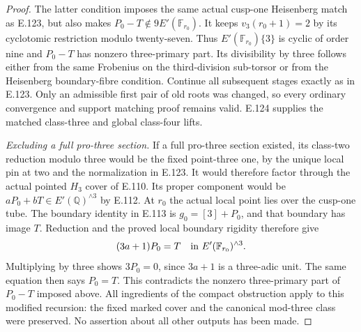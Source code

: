 \begin{proof}
The latter condition imposes the same actual
cusp-one Heisenberg match as E.123, but also makes
$P_0-T\notin9E'(\mathbb F_{r_0})$.
It keeps $v_3(r_0+1)=2$ by its cyclotomic
restriction modulo twenty-seven. Thus
$E'(\mathbb F_{r_0})\{3\}$ is cyclic of order
nine and $P_0-T$ has nonzero three-primary part.
Its divisibility by three follows either from the
same Frobenius on the third-division sub-torsor or
from the Heisenberg boundary-fibre condition.
Continue all subsequent stages exactly as in E.123.
Only an admissible first pair of old roots was
changed, so every ordinary convergence and support
matching proof remains valid. E.124 supplies the
matched class-three and global class-four lifts.

\emph{Excluding a full pro-three section.}
If a full pro-three section existed, its class-two
reduction modulo three would be the fixed point-three
one, by the unique local pin at two and the
normalization in E.123. It would therefore factor
through the actual pointed $H_3$ cover of E.110.
Its proper component would be
$aP_0+bT\in E'(\mathbb Q)^{\wedge3}$ by E.112.
At $r_0$ the actual local point lies over the
cusp-one tube. The boundary identity in E.113 is
$g_0=[3]+P_0$, and that boundary has image $T$.
Reduction and the proved local boundary rigidity
therefore give
\[
                   (3a+1)P_0=T
          \quad\hbox{in }E'(\mathbb F_{r_0})^{\wedge3}.
\]
Multiplying by three shows $3P_0=0$, since
$3a+1$ is a three-adic unit. The same equation
then says $P_0=T$. This contradicts the nonzero
three-primary part of $P_0-T$ imposed above.
All ingredients of the compact obstruction apply
to this modified recursion: the fixed marked
cover and the canonical mod-three class were
preserved. No assertion about all other outputs
has been made.
\end{proof}

